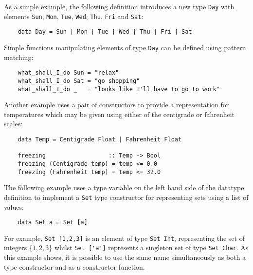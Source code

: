 As a simple example, the following definition introduces a new type \verb"Day"
with elements \verb"Sun", \verb"Mon", \verb"Tue", \verb"Wed", \verb"Thu", \verb"Fri" and \verb"Sat":
\begin{verbatim}
    data Day = Sun | Mon | Tue | Wed | Thu | Fri | Sat
\end{verbatim}
Simple functions manipulating elements of type \verb"Day" can be defined using
pattern matching:
\begin{verbatim}
    what_shall_I_do Sun = "relax"
    what_shall_I_do Sat = "go shopping"
    what_shall_I_do _   = "looks like I'll have to go to work"
\end{verbatim}
Another example uses a pair of constructors to provide a representation
for temperatures which may be given using either of the  centigrade  or
fahrenheit scales:
\begin{verbatim}
    data Temp = Centigrade Float | Fahrenheit Float

    freezing                  :: Temp -> Bool
    freezing (Centigrade temp) = temp <= 0.0
    freezing (Fahrenheit temp) = temp <= 32.0
\end{verbatim}
The following example uses a type variable on the left hand side of the
datatype  definition  to  implement  a   \verb"Set" type   constructor   for
representing sets using a list of values:
\begin{verbatim}
    data Set a = Set [a]
\end{verbatim}
For example, \verb"Set [1,2,3]" is an element of type  \verb"Set Int",  
representing
the set of integers $\{1, 2, 3\}$ whilst 
\verb"Set ['a']" represents  a  singleton
set of type \verb"Set Char".  As this example shows, it is possible to use the
same  name  simultaneously  as  both  a  type  constructor  and  as   a
constructor function.


